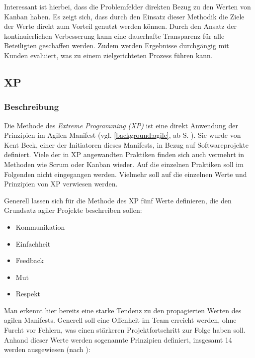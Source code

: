 Interessant ist hierbei, dass die Problemfelder direkten Bezug zu den Werten von Kanban haben. Es zeigt sich, dass durch den Einsatz dieser Methodik die Ziele der Werte direkt zum Vorteil genutzt werden können. Durch den Ansatz der kontinuierlichen Verbesserung kann eine dauerhafte Transparenz für alle Beteiligten geschaffen werden. Zudem werden Ergebnisse durchgängig mit Kunden evaluiert, was zu einem  zielgerichteten Prozess führen kann.  

\subsection{XP}

\subsubsection{Beschreibung}

Die Methode des \textit{Extreme Programming (XP)} ist eine direkt Anwendung der Prinzipien im Agilen Manifest (vgl. \ref{background:agile}, ab S. \pageref{background:agile}). Sie wurde von Kent Beck, einer der Initiatoren dieses Manifests, in Bezug auf Softwareprojekte definiert. \cite[S. 13]{hanser_agile_2010} Viele der in XP angewandten Praktiken finden sich auch vermehrt in Methoden wie Scrum oder Kanban wieder. Auf die einzelnen Praktiken soll im Folgenden nicht eingegangen werden. Vielmehr soll auf die einzelnen Werte und Prinzipien von XP verwiesen werden.

Generell lassen sich für die Methode des XP fünf Werte definieren, die den Grundsatz agiler Projekte beschreiben sollen:

\begin{itemize}[noitemsep, topsep=0pt]
	\item Kommunikation
	\item Einfachheit
	\item Feedback
	\item Mut
	\item Respekt
\end{itemize}

Man erkennt hier bereits eine starke Tendenz zu den propagierten Werten des agilen Manifests. Generell soll eine Offenheit im Team erreicht werden, ohne Furcht vor Fehlern, was einen stärkeren Projektfortschritt zur Folge haben soll. Anhand dieser Werte werden sogenannte Prinzipien definiert, insgesamt 14 werden ausgewiesen (nach ):

